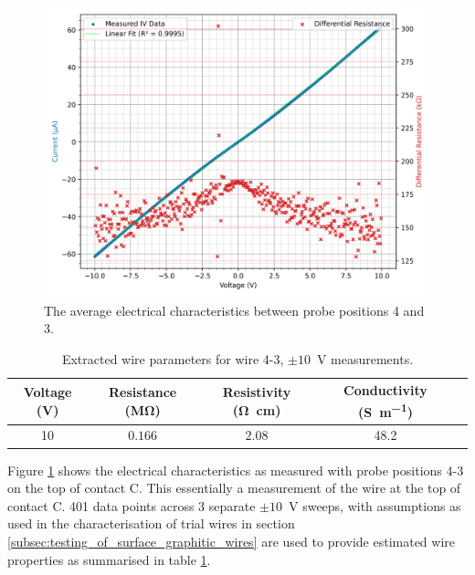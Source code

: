 \begin{refsection}
\begin{figure}[H]
    \centering
    \includegraphics[width=\linewidth]{Chapter7/Figs/Raster/Emitters/43 3x 10V.png}
    \caption{The average electrical characteristics between probe positions 4 and 3.}
    \label{fig:e_43_10v}
\end{figure}

\begin{table}[h!]
\centering
\begin{tabular}{|c|c|c|c|c|}
\hline
\textbf{Voltage (V)} & \textbf{Resistance (\si{\mega\ohm})}  & \textbf{Resistivity (\si{\ohm\centi\metre})} & \textbf{Conductivity (\si{\siemens\per\metre})} \\
\hline
10 & $0.166$ & $2.08$ & 48.2 \\
\hline
\end{tabular}
\caption{Extracted wire parameters for wire 4-3, $\pm10$~\si{\volt} measurements.}
\label{tab:43_e_wire_parameters_10v}
\end{table}

Figure \ref{fig:e_43_10v} shows the electrical characteristics as measured with probe positions 4-3 on the top of contact C. This essentially a measurement of the wire at the top of contact C. 401 data points across 3 separate $\pm10$~\si{\volt} sweeps, with assumptions as used in the characterisation of trial wires in section \ref{subsec:testing_of_surface_graphitic_wires} are used to provide estimated wire properties as summarised in table \ref{tab:43_e_wire_parameters_10v}.


\end{refsection}
